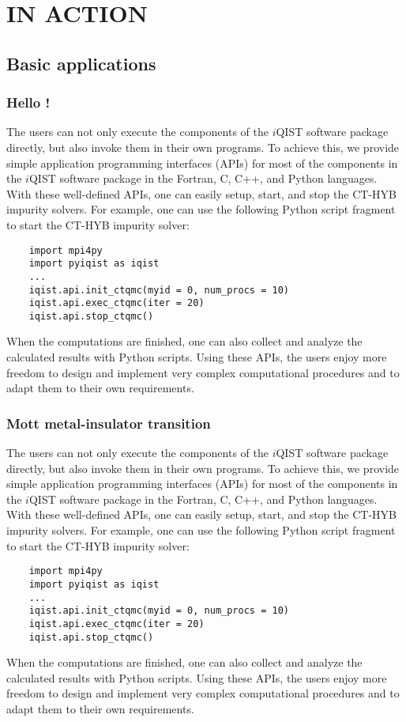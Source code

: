 \chapter{{\iqist} IN ACTION}
\section{Basic applications}
\subsection{Hello {\iqist}!}
The users can not only execute the components of the $i$QIST software package directly, but also invoke them in their own programs. To achieve this, we provide simple application programming interfaces (APIs) for most of the components in the $i$QIST software package in the Fortran, C, C++, and Python languages. With these well-defined APIs, one can easily setup, start, and stop the CT-HYB impurity solvers. For example, one can use the following Python script fragment to start the CT-HYB impurity solver:
\begin{verbatim}
    import mpi4py
    import pyiqist as iqist
    ...
    iqist.api.init_ctqmc(myid = 0, num_procs = 10)
    iqist.api.exec_ctqmc(iter = 20)
    iqist.api.stop_ctqmc()
\end{verbatim}
When the computations are finished, one can also collect and analyze the calculated results with Python scripts. Using these APIs, the users enjoy more freedom to design and implement very complex computational procedures and to adapt them to their own requirements.

\subsection{Mott metal-insulator transition}
The users can not only execute the components of the $i$QIST software package directly, but also invoke them in their own programs. To achieve this, we provide simple application programming interfaces (APIs) for most of the components in the $i$QIST software package in the Fortran, C, C++, and Python languages. With these well-defined APIs, one can easily setup, start, and stop the CT-HYB impurity solvers. For example, one can use the following Python script fragment to start the CT-HYB impurity solver:
\begin{verbatim}
    import mpi4py
    import pyiqist as iqist
    ...
    iqist.api.init_ctqmc(myid = 0, num_procs = 10)
    iqist.api.exec_ctqmc(iter = 20)
    iqist.api.stop_ctqmc()
\end{verbatim}
When the computations are finished, one can also collect and analyze the calculated results with Python scripts. Using these APIs, the users enjoy more freedom to design and implement very complex computational procedures and to adapt them to their own requirements.

